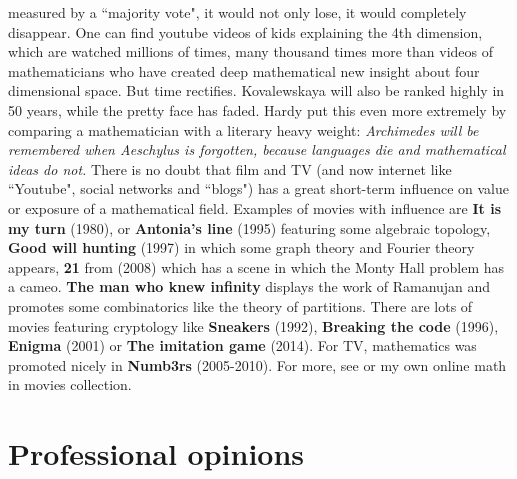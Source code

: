 \documentclass[12pt]{amsart}
\begin{document}
measured by a ``majority vote", it
would not only lose, it would completely disappear. One can find youtube videos of kids explaining the
4th dimension, which are watched millions of times, many thousand times more than videos of 
mathematicians who have created deep mathematical new insight about four dimensional space. 
But time rectifies. Kovalewskaya will also
be ranked highly in 50 years, while the pretty face has faded. Hardy put this even more
extremely by comparing a mathematician with a literary heavy weight: 
{\it Archimedes will be remembered when Aeschylus is forgotten, because languages die 
and mathematical ideas do not.} \cite{HardyApology}
There is no doubt that film and TV (and now internet like ``Youtube", social networks 
and ``blogs") has a great short-term influence on value or exposure of a 
mathematical field. Examples of movies with
influence are {\bf It is my turn} (1980), or {\bf Antonia's line} (1995) 
featuring some algebraic topology, {\bf Good will hunting} (1997) 
in which some graph theory and Fourier theory appears,
{\bf 21} from (2008) which has a scene in which the Monty Hall problem has a cameo.
{\bf The man who knew infinity} displays the work of Ramanujan and promotes some combinatorics
like the theory of partitions. There are lots of movies featuring cryptology like {\bf Sneakers} (1992), 
{\bf Breaking the code} (1996), {\bf Enigma} (2001) or {\bf The imitation game} (2014).
For TV, mathematics was promoted nicely in {\bf Numb3rs} (2005-2010). 
For more, see \cite{MathMovies} or my own online math in movies collection. \\

\section*{Professional opinions} 
\end{document}
